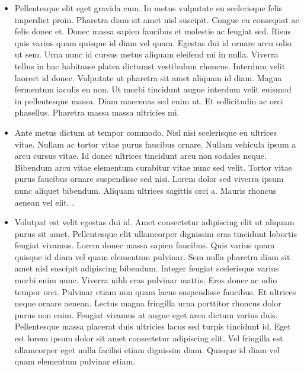 \documentclass[article]{seminar}
\newcommand{\sltitle}[1]{{\centering\textbf{\Large #1}
    \vskip 2em plus 0pt minus 2em\par}} %
\begin{document}
\begin{itemize}
\item Pellentesque elit eget gravida cum. In metus vulputate eu scelerisque
felis imperdiet proin. Pharetra diam sit amet nisl suscipit. Congue eu consequat
ac felis donec et. Donec massa sapien faucibus et molestie ac feugiat sed. Risus
quis varius quam quisque id diam vel quam. Egestas dui id ornare arcu odio ut
sem. Urna nunc id cursus metus aliquam eleifend mi in nulla. Viverra tellus in
hac habitasse platea dictumst vestibulum rhoncus. Interdum velit laoreet id
donec. Vulputate ut pharetra sit amet aliquam id diam. Magna fermentum iaculis
eu non. Ut morbi tincidunt augue interdum velit euismod in pellentesque massa.
Diam maecenas sed enim ut. Et sollicitudin ac orci phasellus. Pharetra massa
massa ultricies mi.
\item Ante metus dictum at tempor commodo. Nisl nisi scelerisque eu ultrices
vitae. Nullam ac tortor vitae purus faucibus ornare. Nullam vehicula ipsum a
arcu cursus vitae. Id donec ultrices tincidunt arcu non sodales neque. Bibendum
arcu vitae elementum curabitur vitae nunc sed velit. Tortor vitae purus faucibus
ornare suspendisse sed nisi. Lorem dolor sed viverra ipsum nunc aliquet
bibendum. Aliquam ultrices sagittis orci a. Mauris rhoncus aenean vel elit.
\pageref{BAR}.
\end{itemize}




\label{BAR}

\begin{itemize}
\item Volutpat est velit egestas dui id. Amet consectetur adipiscing elit ut
aliquam purus sit amet. Pellentesque elit ullamcorper dignissim cras tincidunt
lobortis feugiat vivamus. Lorem donec massa sapien faucibus. Quis varius quam
quisque id diam vel quam elementum pulvinar. Sem nulla pharetra diam sit amet
nisl suscipit adipiscing bibendum. Integer feugiat scelerisque varius morbi enim
nunc. Viverra nibh cras pulvinar mattis. Eros donec ac odio tempor orci.
Pulvinar etiam non quam lacus suspendisse faucibus. Et ultrices neque ornare
aenean. Lectus magna fringilla urna porttitor rhoncus dolor purus non enim.
Feugiat vivamus at augue eget arcu dictum varius duis. Pellentesque massa
placerat duis ultricies lacus sed turpis tincidunt id. Eget est lorem ipsum
dolor sit amet consectetur adipiscing elit. Vel fringilla est ullamcorper eget
nulla facilisi etiam dignissim diam. Quisque id diam vel quam elementum pulvinar
etiam.
\end{itemize}
\end{document}
